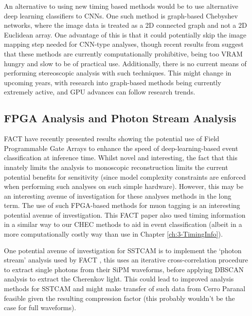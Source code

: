 An alternative to using new timing based methods would be to use alternative deep learning classifiers to CNNs. One such method is graph-based Chebyshev networks, where the image data is treated as a 2D connected graph and not a 2D Euclidean array. One advantage of this is that it could potentially skip the image mapping step needed for CNN-type analyses, though recent results from \cite{adithesis} suggest that these methods are currently computationally prohibitive, being too VRAM hungry and slow to be of practical use. Additionally, there is no current means of performing stereoscopic analysis with such techniques. This might change in upcoming years, with research into graph-based methods being currently extremely active, and GPU advances can follow research trends.

\subsection{FPGA Analysis and Photon Stream Analysis}

FACT have recently presented results showing the potential use of Field Programmable Gate Arrays to enhance the speed of deep-learning-based event classification at inference time. Whilst novel and interesting, the fact that this innately limits the analysis to monoscopic reconstruction limits the current potential benefits for sensitivity (since model complexity constraints are enforced when performing such analyses on such simple hardware). However, this may be an interesting avenue of investigation for these analyses methods in the long term. The use of such FPGA-based methods for muon tagging is an interesting potential avenue of investigation. This FACT paper also used timing information in a similar way to our CHEC methods to aid in event classification (albeit in a more computationally costly way than use in Chapter \ref{ch:3-TimingInfo}).

One potential avenue of investigation for SSTCAM is to implement the `photon stream' analysis used by FACT \cite{factphotonstream}, this uses an iterative cross-correlation procedure to extract single photons from their SiPM waveforms, before applying DBSCAN analysis to extract the Cherenkov light. This could lead to improved analysis methods for SSTCAM and might make transfer of such data from Cerro Paranal feasible given the resulting compression factor (this probably wouldn't be the case for full waveforms).
